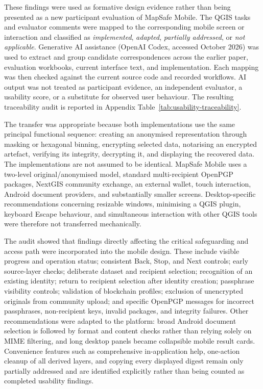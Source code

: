 \documentclass[a4paper,UKenglish,cleveref,autoref,thm-restate]{lipics-v2021}
\begin{document}
These findings were used as formative design evidence rather than being presented as a new participant evaluation of MapSafe Mobile. The QGIS tasks and evaluator comments were mapped to the corresponding mobile screen or interaction and classified as \emph{implemented}, \emph{adapted}, \emph{partially addressed}, or \emph{not applicable}. Generative AI assistance (OpenAI Codex, accessed October 2026) was used to extract and group candidate correspondences across the earlier paper, evaluation workbooks, current interface text, and implementation. Each mapping was then checked against the current source code and recorded workflows. AI output was not treated as participant evidence, an independent evaluator, a usability score, or a substitute for observed user behaviour. The resulting traceability audit is reported in Appendix Table~\ref{tab:usability-traceability}.

The transfer was appropriate because both implementations use the same principal functional sequence: creating an anonymised representation through masking or hexagonal binning, encrypting selected data, notarising an encrypted artefact, verifying its integrity, decrypting it, and displaying the recovered data. The implementations are not assumed to be identical. MapSafe Mobile uses a two-level original/anonymised model, standard multi-recipient OpenPGP packages, NextGIS community exchange, an external wallet, touch interaction, Android document providers, and substantially smaller screens. Desktop-specific recommendations concerning resizable windows, minimising a QGIS plugin, keyboard Escape behaviour, and simultaneous interaction with other QGIS tools were therefore not transferred mechanically.

The audit showed that findings directly affecting the critical safeguarding and access path were incorporated into the mobile design. These include visible progress and operation status; consistent Back, Stop, and Next controls; early source-layer checks; deliberate dataset and recipient selection; recognition of an existing identity; return to recipient selection after identity creation; passphrase visibility controls; validation of blockchain profiles; exclusion of unencrypted originals from community upload; and specific OpenPGP messages for incorrect passphrases, non-recipient keys, invalid packages, and integrity failures. Other recommendations were adapted to the platform: broad Android document selection is followed by format and content checks rather than relying solely on MIME filtering, and long desktop panels became collapsible mobile result cards. Convenience features such as comprehensive in-application help, one-action cleanup of all derived layers, and copying every displayed digest remain only partially addressed and are identified explicitly rather than being counted as completed usability findings.
\end{document}
